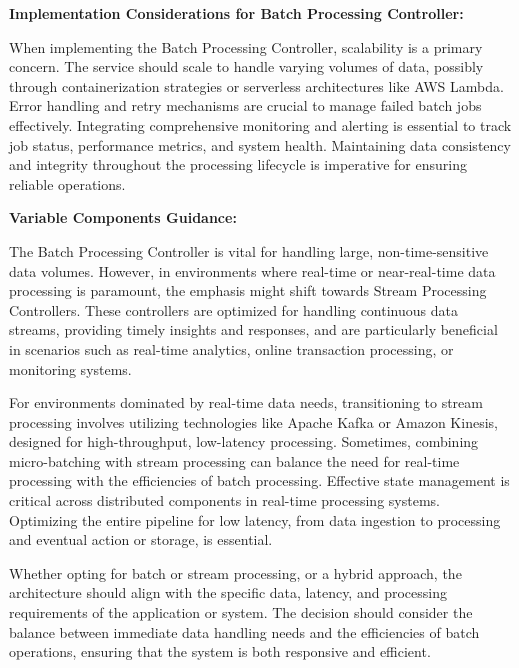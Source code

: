 \documentclass[review]{elsarticle}
\begin{document}
\begin{enumerate}
    \textbf{Implementation Considerations for Batch Processing Controller:}

    When implementing the Batch Processing Controller, scalability is a primary concern. The service should scale to handle varying volumes of data, possibly through containerization strategies or serverless architectures like AWS Lambda. Error handling and retry mechanisms are crucial to manage failed batch jobs effectively. Integrating comprehensive monitoring and alerting is essential to track job status, performance metrics, and system health. Maintaining data consistency and integrity throughout the processing lifecycle is imperative for ensuring reliable operations.

    \textbf{Variable Components Guidance:}
    
    The Batch Processing Controller is vital for handling large, non-time-sensitive data volumes. However, in environments where real-time or near-real-time data processing is paramount, the emphasis might shift towards Stream Processing Controllers. These controllers are optimized for handling continuous data streams, providing timely insights and responses, and are particularly beneficial in scenarios such as real-time analytics, online transaction processing, or monitoring systems.

    For environments dominated by real-time data needs, transitioning to stream processing involves utilizing technologies like Apache Kafka or Amazon Kinesis, designed for high-throughput, low-latency processing. Sometimes, combining micro-batching with stream processing can balance the need for real-time processing with the efficiencies of batch processing. Effective state management is critical across distributed components in real-time processing systems. Optimizing the entire pipeline for low latency, from data ingestion to processing and eventual action or storage, is essential.

    Whether opting for batch or stream processing, or a hybrid approach, the architecture should align with the specific data, latency, and processing requirements of the application or system. The decision should consider the balance between immediate data handling needs and the efficiencies of batch operations, ensuring that the system is both responsive and efficient.


\end{enumerate}
\end{document}
